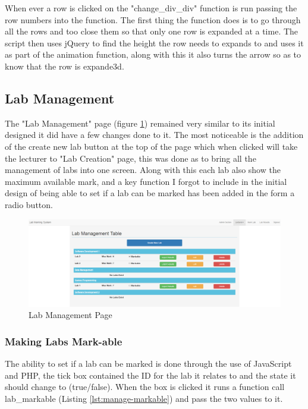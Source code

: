 \documentclass[12pt]{article}  %
\begin{document}
\noindent When ever a row is clicked on the "change\_div\_div" function is run passing the row numbers into the function. The first thing the function does is to go through all the rows and too close them so that only one row is expanded at a time. The script then uses jQuery to find the height the row needs to expands to and uses it as part of the animation function, along with this it also turns the arrow so as to know that the row is expande3d.








\subsection{Lab Management}

The "Lab Management" page (figure \ref{fig:lab-management}) remained very similar to its initial designed it did have a few changes done to it. The most noticeable is the addition of the create new lab button at the top of the page which when clicked will take the lecturer to "Lab Creation" page, this was done as to bring all the management of labs into one screen. Along with this each lab also show the maximum available mark, and a key function I forgot to include in the initial design of being able to set if a lab can be marked has been added in the form a radio button.

\begin{figure}[H]
    \centering
    \includegraphics[width=1\textwidth]{images/implementation/lab-management-page.png}
    \caption{Lab Management Page}
    \label{fig:lab-management}
\end{figure}


\subsubsection{Making Labs Mark-able}

The ability to set if a lab can be marked is done through the use of JavaScript and PHP, the tick box contained the ID for the lab it relates to and the state it should change to (true/false). When the box is clicked it runs a function call lab\_markable (Listing \ref{lst:manage-markable}) and pass the two values to it. 
\end{document}
